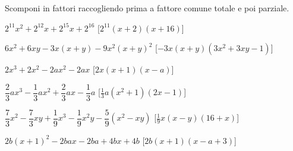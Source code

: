 % 

\begin{esercizio}[\Ast]
\label{ese:div.016}
Scomponi in fattori raccogliendo prima a fattore comune totale e poi parziale.
\begin{enumeratea}
 \item $2^{11}x^{2}+2^{12}x+2^{15}x+2^{16}$
  \hfill [$2^{11}(x+2)(x+16)$]
 \item $6x^{2}+6xy-3x(x+y)-9x^{2}(x+y)^{2}$
  \hfill [$-3x(x+y)\left(3x^2+3xy-1\right)$]
 \item $2x^{3}+2x^{2}-2ax^{2}-2ax$
  \hfill [$2x(x+1)(x-a)$]
 \item $\dfrac{2}{3}ax^{3}-\dfrac{1}{3}ax^{2}+\dfrac{2}{3}ax-\dfrac{1}{3}a$
  \hfill [$\frac{1}{3}a(x^{2}+1)(2x-1)$]
 \item $\dfrac{7}{3}x^{2}-\dfrac{7}{3}xy+\dfrac{1}{9}x^{3}-
        \dfrac{1}{9}x^{2}y-\dfrac{5}{9}(x^{2}-xy)$
  \hfill [$\frac{1}{9}x(x-y)(16+x)$]
 \item $2b(x+1)^{2}-2bax-2ba+4bx+4b$
  \hfill [$2b(x+1)(x-a+3)$]
\end{enumeratea}
\end{esercizio}

